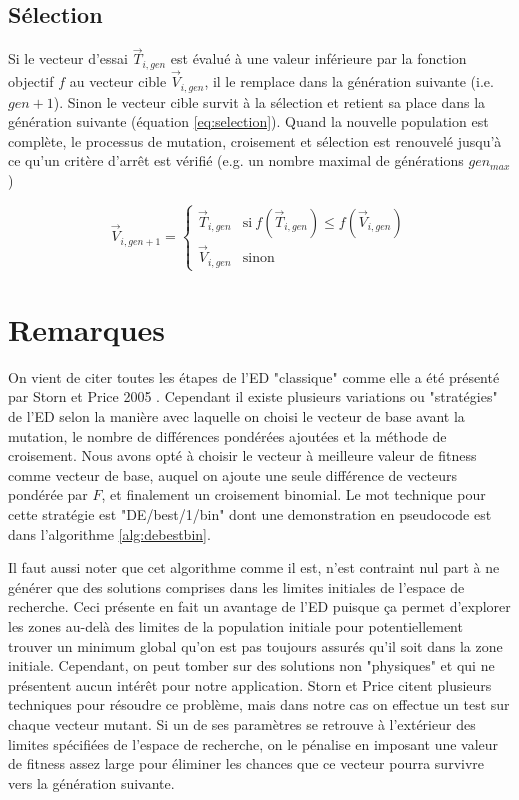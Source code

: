 \subsection{Sélection}
Si le vecteur d'essai $\vec{T}_{i,gen}$ est évalué à une valeur inférieure par la fonction objectif $f$ au vecteur cible $\vec{V}_{i,gen}$, il le remplace dans la génération suivante (i.e. $gen + 1$). Sinon le vecteur cible survit à la sélection et retient sa place dans la génération suivante (équation \ref{eq:selection}).
Quand la nouvelle population est complète, le processus de mutation, croisement et sélection est renouvelé jusqu'à ce qu'un critère d'arrêt est vérifié (e.g. un nombre maximal de générations $gen_{max}$)

\begin{equation}
  \label{eq:selection}
  \vec{V}_{i, gen + 1} =
  \begin{cases}
    \vec{T}_{i,gen} & \text{si}\ f(\vec{T}_{i,gen}) \leq f(\vec{V}_{i,gen})\\
    \vec{V}_{i,gen} & \text{sinon}
  \end{cases}
\end{equation}

\section{Remarques}
On vient de citer toutes les étapes de l'ED "classique" comme elle a été présenté par Storn et Price 2005 \cite{Price2005}. Cependant il existe plusieurs variations ou "stratégies" de l'ED selon la manière avec laquelle on choisi le vecteur de base avant la mutation, le nombre de différences pondérées ajoutées et la méthode de croisement. Nous avons opté à choisir le vecteur à meilleure valeur de fitness comme vecteur de base, auquel on ajoute une seule différence de vecteurs pondérée par $F$, et finalement un croisement binomial. Le mot technique pour cette stratégie est "DE/best/1/bin" dont une demonstration en pseudocode est dans l'algorithme \ref{alg:debestbin}.

Il faut aussi noter que cet algorithme comme il est, n'est contraint nul part à ne générer que des solutions comprises dans les limites initiales de l'espace de recherche. Ceci présente en fait un avantage de l'ED puisque ça permet d'explorer les zones au-delà des limites de la population initiale pour potentiellement trouver un minimum global qu'on est pas toujours assurés qu'il soit dans la zone initiale. Cependant, on peut tomber sur des solutions non "physiques" et qui ne présentent aucun intérêt pour notre application. Storn et Price citent plusieurs techniques pour résoudre ce problème, mais dans notre cas on effectue un test sur chaque vecteur mutant. Si un de ses paramètres se retrouve à l'extérieur des limites spécifiées de l'espace de recherche, on le pénalise en imposant une valeur de fitness assez large pour éliminer les chances que ce vecteur pourra survivre vers la génération suivante.

